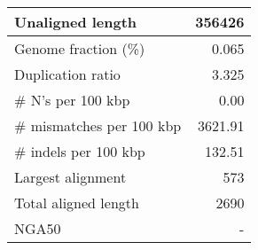 \documentclass[12pt,a4paper]{article}
\begin{document}
\begin{table}[ht]
\begin{center}
\begin{tabular}{|l*{1}{|r}|}
Unaligned length & 356426 \\ \hline
Genome fraction (\%) & 0.065 \\ \hline
Duplication ratio & 3.325 \\ \hline
\# N's per 100 kbp & 0.00 \\ \hline
\# mismatches per 100 kbp & 3621.91 \\ \hline
\# indels per 100 kbp & 132.51 \\ \hline
Largest alignment & 573 \\ \hline
Total aligned length & 2690 \\ \hline
NGA50 & - \\ \hline
\end{tabular}
\end{center}
\end{table}
\end{document}
